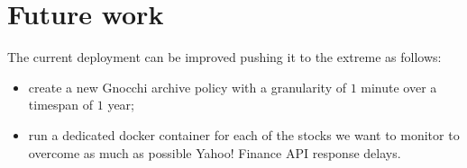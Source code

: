 \documentclass[11pt,a4paper]{article}
\begin{document}
\section{Future work}
The current deployment can be improved pushing it to the extreme as follows:
\begin{itemize}
    \item create a new Gnocchi archive policy with a granularity of $1$ minute over a timespan of $1$ year;
    \item run a dedicated docker container for each of the stocks we want to monitor to overcome as much as possible Yahoo! Finance API response delays.
\end{itemize}
\end{document}
